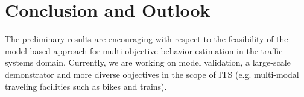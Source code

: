 \documentclass[conference]{../cls/IEEEtran}
\begin{document}
\section{Conclusion and Outlook}

The preliminary results are encouraging with respect to the feasibility of the
model-based approach for multi-objective behavior estimation in the traffic
systems domain. Currently, we are working on model validation, a large-scale
demonstrator and more diverse objectives in the scope of ITS (e.g. multi-modal
traveling facilities such as bikes and trains).



\end{document}
